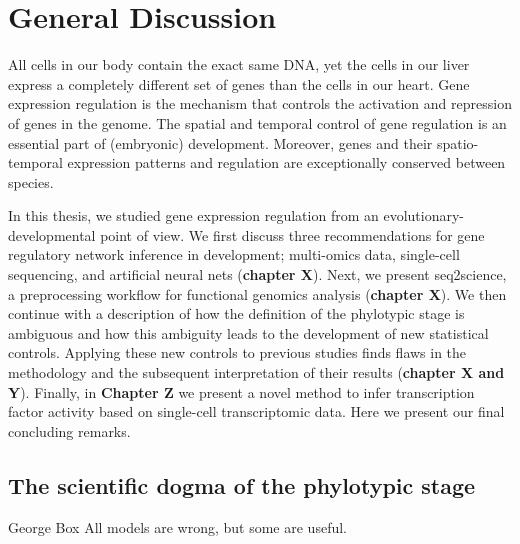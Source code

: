 \chapter{General Discussion}\thumbforchapter
\newpage

All cells in our body contain the exact same DNA, yet the cells in our liver express a completely different set of genes than the cells in our heart. Gene expression regulation is the mechanism that controls the activation and repression of genes in the genome. The spatial and temporal control of gene regulation is an essential part of (embryonic) development. Moreover, genes and their spatio-temporal expression patterns and regulation are exceptionally conserved between species.

In this thesis, we studied gene expression regulation from an evolutionary-developmental point of view. We first discuss three recommendations for gene regulatory network inference in development; multi-omics data, single-cell sequencing, and artificial neural nets (\textbf{chapter X}). Next, we present seq2science, a preprocessing workflow for functional genomics analysis (\textbf{chapter X}). We then continue with a description of how the definition of the phylotypic stage is ambiguous and how this ambiguity leads to the development of new statistical controls. Applying these new controls to previous studies finds flaws in the methodology and the subsequent interpretation of their results (\textbf{chapter X and Y}). Finally, in \textbf{Chapter Z} we present a novel method to infer transcription factor activity based on single-cell transcriptomic data. Here we present our final concluding remarks.

\section{The scientific dogma of the phylotypic stage}

\begin{shadequote}[c]{George Box}
All models are wrong, but some are useful.
\end{shadequote}

